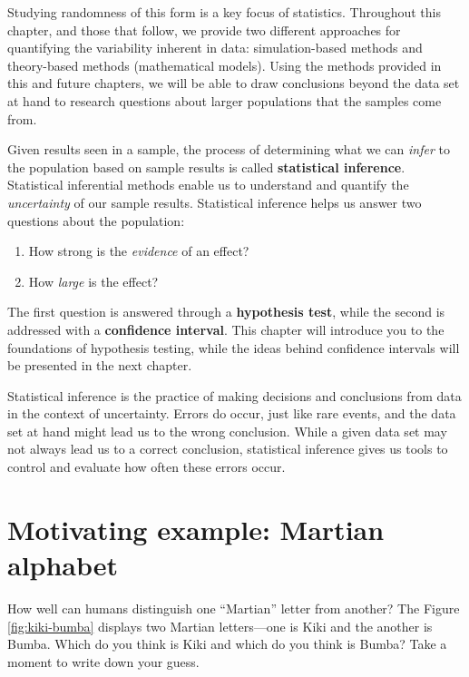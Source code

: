 \documentclass[
  10pt,
  openany]{book}
\providecommand{\tightlist}{%
  \setlength{\itemsep}{0pt}\setlength{\parskip}{0pt}}
\theoremstyle{definition}
\theoremstyle{definition}
\theoremstyle{definition}
\theoremstyle{definition}
\theoremstyle{remark}
\begin{document}
Studying randomness of this form is a key focus of statistics. Throughout this chapter, and those that follow, we provide two different approaches for quantifying the variability inherent in data: simulation-based methods and theory-based methods (mathematical models). Using the methods provided in this and future chapters, we will be able to draw conclusions beyond the data set at hand to research questions about larger populations that the samples come from.

Given results seen in a sample, the process of determining what we can \emph{infer} to the population based on sample results is called \textbf{statistical inference}. Statistical inferential methods enable us to understand and quantify the \emph{uncertainty} of our sample results. Statistical inference helps us answer two questions about the population:

\begin{enumerate}
\def\labelenumi{\arabic{enumi}.}
\tightlist
\item
  How strong is the \emph{evidence} of an effect?
\item
  How \emph{large} is the effect?
\end{enumerate}

The first question is answered through a \textbf{hypothesis test}, while the second is addressed with a \textbf{confidence interval}. This chapter will introduce you to the foundations of hypothesis testing, while the ideas behind confidence intervals will be presented in the next chapter.

Statistical inference is the practice of making decisions and conclusions from data in the context of uncertainty. Errors do occur, just like rare events, and the data set at hand might lead us to the wrong conclusion. While a given data set may not always lead us to a correct conclusion, statistical inference gives us tools to control and evaluate how often these errors occur.

\section{Motivating example: Martian alphabet}\label{Martian}

How well can humans distinguish one ``Martian'' letter from another? The Figure \ref{fig:kiki-bumba} displays two Martian letters---one is Kiki and the another is Bumba. Which do you think is Kiki and which do you think is Bumba? Take a moment to write down your guess.
\end{document}
